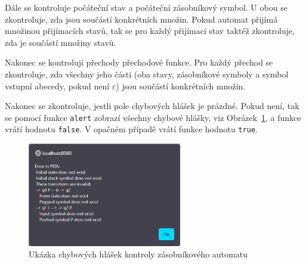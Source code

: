 Dále se kontroluje počáteční stav a počáteční zásobníkový symbol. U obou se zkontroluje, zda jsou součástí konkrétních množin. Pokud automat přijímá množinou přijímacích stavů, tak se pro každý přijímací stav taktéž zkontroluje, zda je součástí množiny stavů. 

Nakonec se kontrolují přechody přechodové funkce. Pro každý přechod se zkontroluje, zda všechny jeho části (oba stavy, zásobníkové symboly a symbol vstupní abecedy, pokud není $\varepsilon$) jsou součástí konkrétních množin.

Nakonec se zkontroluje, jestli pole chybových hlášek je prázdné. Pokud není, tak se pomocí funkce \texttt{alert} zobrazí všechny chybové hlášky, viz Obrázek~\ref{fig:PDACheckErrors}, a funkce vrátí hodnotu \texttt{false}. V opačném případě vrátí funkce hodnotu \texttt{true}.

\begin{figure}[h]
    \centering
    \includegraphics[width=0.6\textwidth]{Figures/PrntScrn_PDACheckErrors.png}
    \caption{Ukázka chybových hlášek kontroly zásobníkového automatu}\label{fig:PDACheckErrors}
\end{figure}

\endinput